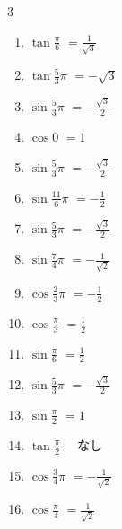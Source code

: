 \begin{multicols}{3}
\begin{enumerate}
  \item $\displaystyle \tan{\frac{\pi}{6}}$
        $\displaystyle =\frac{1}{\sqrt{3}}$

  \item $\displaystyle \tan{\frac{5}{3}\pi}$
        $\displaystyle =-\sqrt{3}$

  \item $\displaystyle \sin{\frac{5}{3}\pi}$
        $\displaystyle =-\frac{\sqrt{3}}{2}$

  \item $\displaystyle \cos{0}$
        $\displaystyle =1$

  \item $\displaystyle \sin{\frac{5}{3}\pi}$
        $\displaystyle =-\frac{\sqrt{3}}{2}$

  \item $\displaystyle \sin{\frac{11}{6}\pi}$
        $\displaystyle =-\frac{1}{2}$

  \item $\displaystyle \sin{\frac{5}{3}\pi}$
        $\displaystyle =-\frac{\sqrt{3}}{2}$

  \item $\displaystyle \sin{\frac{7}{4}\pi}$
        $\displaystyle =-\frac{1}{\sqrt{2}}$

  \item $\displaystyle \cos{\frac{2}{3}\pi}$
        $\displaystyle =-\frac{1}{2}$

  \item $\displaystyle \cos{\frac{\pi}{3}}$
        $\displaystyle =\frac{1}{2}$

  \item $\displaystyle \sin{\frac{\pi}{6}}$
        $\displaystyle =\frac{1}{2}$

  \item $\displaystyle \sin{\frac{5}{3}\pi}$
        $\displaystyle =-\frac{\sqrt{3}}{2}$

\columnbreak %

\resetques

  \item $\displaystyle \sin{\frac{\pi}{2}}$
        $\displaystyle =1$

  \item $\displaystyle \tan{\frac{\pi}{2}}$
        $\displaystyle \quad なし$

  \item $\displaystyle \cos{\frac{3}{4}\pi}$
        $\displaystyle =-\frac{1}{\sqrt{2}}$

  \item $\displaystyle \cos{\frac{\pi}{4}}$
        $\displaystyle =\frac{1}{\sqrt{2}}$


\end{enumerate}
\end{multicols}
